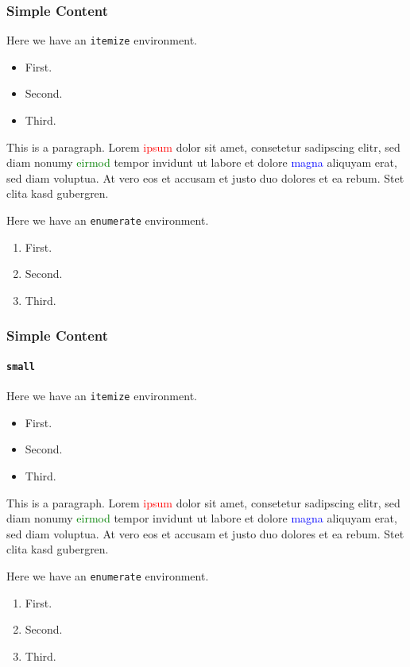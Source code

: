 	\begin{frame}
		\frametitle{Simple Content}
		Here we have an \texttt{itemize} environment.
		\begin{itemize}
			\item First.
			\item Second.
			\item Third.
		\end{itemize}
		\vspace{1em}

		This is a paragraph. Lorem \textcolor{red}{ipsum} dolor sit amet, consetetur sadipscing elitr, sed diam nonumy \textcolor{green}{eirmod} tempor invidunt ut labore et dolore \textcolor{blue}{magna} aliquyam erat, sed diam voluptua. At vero eos et accusam et justo duo dolores et ea rebum. Stet clita kasd gubergren.
		\vspace{1em}

		Here we have an \texttt{enumerate} environment.
		\begin{enumerate}
			\item First.
			\item Second.
			\item Third.
		\end{enumerate}
	\end{frame}

	\begin{framefont}{\small}
	\begin{frame}
		\frametitle{Simple Content}
		\framesubtitle{\texttt{small}}
		Here we have an \texttt{itemize} environment.
		\begin{itemize}
			\item \small First.
			\item \small Second.
			\item \small Third.
		\end{itemize}
		\vspace{1em}

		This is a paragraph. Lorem \textcolor{red}{ipsum} dolor sit amet, consetetur sadipscing elitr, sed diam nonumy \textcolor{green}{eirmod} tempor invidunt ut labore et dolore \textcolor{blue}{magna} aliquyam erat, sed diam voluptua. At vero eos et accusam et justo duo dolores et ea rebum. Stet clita kasd gubergren.
		\vspace{1em}

		Here we have an \texttt{enumerate} environment.
		\begin{enumerate}
			\item \small First.
			\item \small Second.
			\item \small Third.
		\end{enumerate}
	\end{frame}
	\end{framefont}


